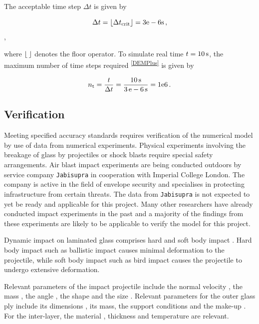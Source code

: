 \documentclass[format=acmtog,12pt,screen=true,review=false,natbib=false,]{acmart}
\DeclarePairedDelimiter\floor{\lfloor}{\rfloor}
\begin{document}
The acceptable time step $\Delta t$ is given by

\begin{equation}
    \label{eq:deltat}
    \Delta t= \floor{\Delta t_{\rm{crit}}} = 3\rm{e}-6{\rm{s}}\,,
\end{equation},

where $\floor{\,}$ denotes the floor operator. To simulate real time $t=10\,{\rm{s}}$, the maximum number of time steps required \cite{Far19}\textsuperscript{\ref{DEMPlus}} is given by

\begin{equation}
    \label{eq:nt}
    n_{\rm{t}}=\frac{t}{\Delta t}=\frac{10\,{\rm{s}}}{3\,{\rm{e}}-6\,{\rm{s}}}=1{\rm{e}}6\,.
\end{equation}

\subsection{Verification}
\label{subsec:Verification}

Meeting specified accuracy standards \cite{Sto15} requires verification of the numerical model by use of data from numerical experiments. Physical experiments involving the breakage of glass by projectiles or shock blasts require special safety arrangements. Air blast impact experiments are being conducted outdoors by service company \texttt{Jabisupra} \cite{Jab16} in cooperation with Imperial College London. The company is active in the field of envelope security and specialises in protecting infrastructure from certain threats. The data from \texttt{Jabisupra} is not expected to yet be ready and applicable for this project. Many other researchers have already conducted impact experiments in the past and a majority of the findings from these experiments are likely to be applicable to verify the model for this project.

\bigbreak
Dynamic impact on laminated glass comprises hard and soft body impact \cite{Moh17}. Hard body impact such as ballistic impact \cite{Bra10} causes minimal deformation to the projectile, while soft body impact such as bird impact \cite{Moh17} causes the projectile to undergo extensive deformation.

\bigbreak
Relevant parameters of the impact projectile include the normal velocity \cite{Gra98, Kar14, Dar13, Wu14}, the mass \cite{Kar14, Dar13}, the angle \cite{Gra98, Kar14, Dar13}, the shape \cite{Dar13} and the size \cite{Wu14}. Relevant parameters for the outer glass ply include its dimensions \cite{Wan18}, its mass, the support conditions \cite{Wan18} and the make-up \cite{Wan18}. For the inter-layer, the material \cite{Moh18, Wan18, Mon04}, thickness \cite{Ji98, Kar14, Wan18} and temperature \cite{Moh18, Zha19} are relevant.
\end{document}
